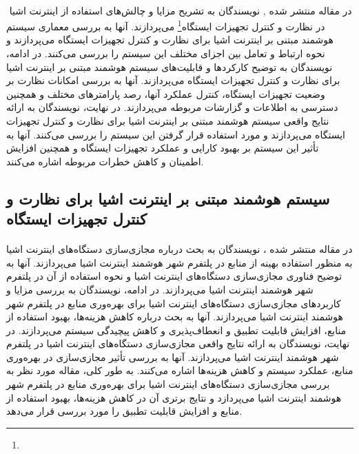 \paragraph{}{‍
    در مقاله منتشر شده , نویسندگان به تشریح مزایا و چالش‌های استفاده از اینترنت اشیا در نظارت و کنترل تجهیزات ایستگاه\footnote{} می‌پردازند.
    آنها به بررسی معماری سیستم هوشمند مبتنی بر اینترنت اشیا برای نظارت و کنترل تجهیزات ایستگاه می‌پردازند و 
    نحوه ارتباط و تعامل بین اجزای مختلف این سیستم را بررسی می‌کنند. در ادامه، نویسندگان به توضیح کارکردها و 
    قابلیت‌های سیستم هوشمند مبتنی بر اینترنت اشیا برای نظارت و کنترل تجهیزات ایستگاه می‌پردازند. آنها به 
    بررسی امکانات نظارت بر وضعیت تجهیزات ایستگاه، کنترل عملکرد آنها، رصد پارامترهای مختلف و همچنین دسترسی 
    به اطلاعات و گزارشات مربوطه می‌پردازند. در نهایت، نویسندگان به ارائه نتایج واقعی سیستم هوشمند مبتنی بر اینترنت 
    اشیا برای نظارت و کنترل تجهیزات ایستگاه می‌پردازند و مورد استفاده قرار گرفتن این سیستم را بررسی می‌کنند. 
    آنها به تأثیر این سیستم بر بهبود کارایی و عملکرد تجهیزات ایستگاه و همچنین افزایش اطمینان و کاهش خطرات
    مربوطه اشاره می‌کنند.
‍}

\subsection{
    سیستم هوشمند مبتنی بر اینترنت اشیا برای نظارت و کنترل تجهیزات ایستگاه
}
\label{subsec:iot_device_virtualization}
\paragraph{}{
    در مقاله منتشر شده ، نویسندگان به بحث درباره مجازی‌سازی دستگاه‌های اینترنت اشیا به منظور استفاده
    بهینه از منابع در پلتفرم شهر هوشمند اینترنت اشیا می‌پردازند. آنها به توضیح فناوری مجازی‌سازی دستگاه‌های اینترنت
    اشیا و نحوه استفاده از آن در پلتفرم شهر هوشمند اینترنت اشیا می‌پردازند. در ادامه، نویسندگان به بررسی مزایا و 
    کاربردهای مجازی‌سازی دستگاه‌های اینترنت اشیا برای بهره‌وری منابع در پلتفرم شهر هوشمند اینترنت اشیا می‌پردازند. 
    آنها به بحث درباره کاهش هزینه‌ها، بهبود استفاده از منابع، افزایش قابلیت تطبیق و انعطاف‌پذیری و کاهش پیچیدگی 
    سیستم می‌پردازند. در نهایت، نویسندگان به ارائه نتایج واقعی مجازی‌سازی دستگاه‌های اینترنت اشیا در پلتفرم شهر هوشمند 
    اینترنت اشیا می‌پردازند. آنها به بررسی تأثیر مجازی‌سازی در بهره‌وری منابع، عملکرد سیستم و کاهش هزینه‌ها اشاره
    می‌کنند. به طور کلی، مقاله مورد نظر به بررسی مجازی‌سازی دستگاه‌های اینترنت اشیا برای بهره‌وری منابع در پلتفرم شهر
    هوشمند اینترنت اشیا می‌پردازد و نتایج برتری آن در کاهش هزینه‌ها، بهبود استفاده از منابع و افزایش قابلیت تطبیق را
    مورد بررسی قرار می‌دهد.
‍}

